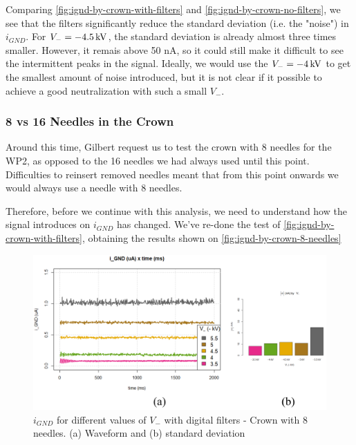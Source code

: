 \documentclass[oneside,12pt]{article}
\begin{document}
Comparing \autoref{fig:ignd-by-crown-with-filters} and \autoref{fig:ignd-by-crown-no-filters}, we see that the filters significantly 
reduce the standard deviation (i.e. the "noise") in $i_{GND}$. For $V_- = - 4.5 \,\mathrm{kV}$, the standard deviation is already almost 
three times smaller. However, it remais above 50 nA, so it could still make it difficult to see the intermittent peaks in the signal.
Ideally, we would use the $V_- = - 4 \,\mathrm{kV}$ to get the smallest amount of noise introduced, but it is not clear if it possible
to achieve a good neutralization with such a small $V_-$.

\subsubsection{8 vs 16 Needles in the Crown}

Around this time, Gilbert request us to test the crown with 8 needles for the WP2, as opposed to the 16 needles we had always used until 
this point. Difficulties to reinsert removed needles meant that from this point onwards we would always use a needle with 8 needles. 

Therefore, before we continue with this analysis, we need to understand how the signal introduces on $i_{GND}$ has changed. We've re-done 
the test of \autoref{fig:ignd-by-crown-with-filters}, obtaining the results shown on \autoref{fig:ignd-by-crown-8-needles}

\begin{figure}[h!]
    \centering
    \includegraphics[width=1\textwidth,trim=1 1 1 1,clip]{figures/ignd-by-crown-8-needles.png}
    \caption{$i_{GND}$ for different values of $V_-$ with digital filters - Crown with 8 needles. (a) Waveform and (b) standard deviation}
    \label{fig:ignd-by-crown-8-needles}
\end{figure}
\end{document}
